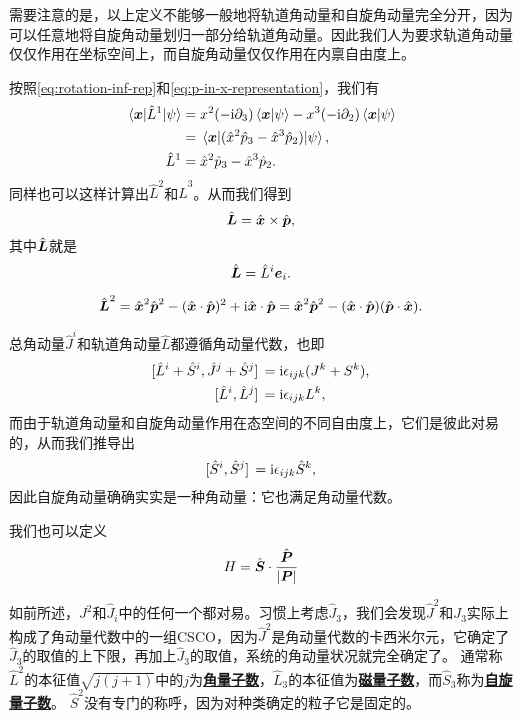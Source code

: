 \documentclass[hyperref, UTF8, a4paper]{ctexart}
\newcommand*{\ii}{\mathrm{i}}
\newcommand{\concept}[1]{\underline{\textbf{#1}}}
\begin{document}
需要注意的是，以上定义不能够一般地将轨道角动量和自旋角动量完全分开，因为可以任意地将自旋角动量划归一部分给轨道角动量。因此我们人为要求轨道角动量仅仅作用在坐标空间上，而自旋角动量仅仅作用在内禀自由度上。

按照\eqref{eq:rotation-inf-rep}和\eqref{eq:p-in-x-representation}，我们有
\[
    \begin{aligned}
        \mel{\vb*{x}}{\hat{L}^1}{\psi} &= x^2 (- \ii \partial_3) \braket{\vb*{x}}{\psi} - x^3 (- \ii \partial_2) \braket{\vb*{x}}{\psi} \\
        &= \mel{\vb*{x}}{(\hat{x}^2 \hat{p}_3 - \hat{x}^3 \hat{p}_2)}{\psi}, \\
        \hat{L}^1 &= \hat{x}^2 \hat{p}_3 - \hat{x}^3 \hat{p}_2.
    \end{aligned}
\]
同样也可以这样计算出$\hat{L}^2$和$\hat{L}^3$。从而我们得到
\begin{equation}
    \hat{\vb*{L}} = \hat{\vb*{x}} \times \hat{\vb*{p}},
\end{equation}
其中$\hat{\vb*{L}}$就是
\begin{equation}
    \hat{\vb*{L}} = \hat{L}^i \vb*{e}_i.
\end{equation}

\begin{equation}
    \hat{\vb*{L}}^2 = \hat{\vb*{x}}^2 \hat{\vb*{p}}^2 - (\hat{\vb*{x}} \cdot \hat{\vb*{p}})^2 + \ii \hat{\vb*{x}} \cdot \hat{\vb*{p}} = \hat{\vb*{x}}^2 \hat{\vb*{p}}^2 - (\hat{\vb*{x}} \cdot \hat{\vb*{p}}) (\hat{\vb*{p}} \cdot \hat{\vb*{x}}).
\end{equation}

总角动量$\hat{J}^i$和轨道角动量$\hat{L}$都遵循角动量代数，也即
\[
    \begin{aligned}
        \comm*{\hat{L}^i+\hat{S}^i}{\hat{J}^j+\hat{S}^j} &= \ii \epsilon_{ijk} (J^k+S^k), \\
        \comm*{\hat{L}^i}{\hat{L}^j} &= \ii \epsilon_{ijk} L^k,
    \end{aligned}
\]
而由于轨道角动量和自旋角动量作用在态空间的不同自由度上，它们是彼此对易的，从而我们推导出
\[
    \comm*{\hat{S}^i}{\hat{S}^j} = \ii \epsilon_{ijk} \hat{S}^k,
\]
因此自旋角动量确确实实是一种角动量：它也满足角动量代数。

我们也可以定义
\begin{equation}
    H = \hat{\vb*{S}} \cdot \frac{\hat{\vb*{P}}}{\abs{\vb*{P}}}
\end{equation}

如前所述，$J^2$和$\hat{J}_i$中的任何一个都对易。习惯上考虑$\hat{J}_3$，我们会发现$\hat{J}^2$和$J_3$实际上构成了角动量代数中的一组CSCO，因为$\hat{J}^2$是角动量代数的卡西米尔元，它确定了$\hat{J}_3$的取值的上下限，再加上$\hat{J}_3$的取值，系统的角动量状况就完全确定了。
通常称$\hat{L}^2$的本征值$\sqrt{j(j+1)}$中的$j$为\concept{角量子数}，$\hat{L}_3$的本征值为\concept{磁量子数}，而$\hat{S}_3$称为\concept{自旋量子数}。
$\hat{S}^2$没有专门的称呼，因为对种类确定的粒子它是固定的。
\end{document}
